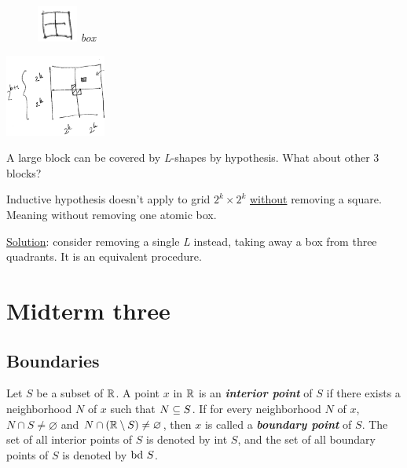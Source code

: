 \documentclass[12pt]{article}
\begin{document}
\begin{itemize}
\begin{figure}[htbp]
\centering
\includegraphics[width=50]{Midterm two/screenshot_2017-03-03_16-00-29.png}
\Leftarrow\textit{box}
\end{figure} 

\begin{center}
\includegraphics[width=125]{Midterm two/screenshot_2017-03-03_16-01-43.png}
\end{center} A large block can be
covered by \emph{L}-shapes by hypothesis. What about other 3 blocks?

Inductive hypothesis doesn't apply to grid \(2^k\times2^k\) \uline{without}
removing a square. Meaning without removing one atomic box.

\uline{Solution}: consider removing a single \emph{L} instead, taking away a box from
three quadrants. It is an equivalent procedure.
\end{itemize}

\section{Midterm three}
\label{sec:org40a7fff}
\subsection{Boundaries}
\label{sec:org266f16c}
\begin{definition}
  Let $S$ be a subset of $\mathbb{R}$. A point $x$ in $\mathbb{R}$ is an
  \textit{\textbf{interior point}} of $S$ if there exists a neighborhood $N$
  of $x$ such that $N \subseteq S$. If for every neighborhood $N$ of $x$, $N \cap
  S \ne \varnothing$ and $N \cap (\mathbb{R} \setminus S) \ne \varnothing$, then $x$ is called a
  \textit{\textbf{boundary point}} of $S$. The set of all interior points of
  $S$ is denoted by int $S$, and the set of all boundary points of $S$ is
  denoted by $\text{bd }S$.
\end{definition}
\end{document}
